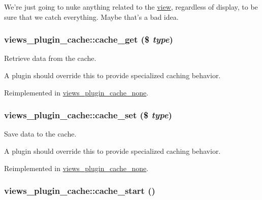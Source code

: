 We're just going to nuke anything related to the \hyperlink{classview}{view}, regardless of display, to be sure that we catch everything. Maybe that's a bad idea. \hypertarget{classviews__plugin__cache_77d1ef6d62d4eb84209cf310194b173b}{
\subsubsection[{cache\_\-get}]{\setlength{\rightskip}{0pt plus 5cm}views\_\-plugin\_\-cache::cache\_\-get (\$ {\em type})}}
\label{classviews__plugin__cache_77d1ef6d62d4eb84209cf310194b173b}


Retrieve data from the cache.

A plugin should override this to provide specialized caching behavior. 

Reimplemented in \hyperlink{classviews__plugin__cache__none_8c0a82cd971ea8abc1045107726a3f1d}{views\_\-plugin\_\-cache\_\-none}.\hypertarget{classviews__plugin__cache_4089f1652603b3e1012a8b0f00407c05}{
\subsubsection[{cache\_\-set}]{\setlength{\rightskip}{0pt plus 5cm}views\_\-plugin\_\-cache::cache\_\-set (\$ {\em type})}}
\label{classviews__plugin__cache_4089f1652603b3e1012a8b0f00407c05}


Save data to the cache.

A plugin should override this to provide specialized caching behavior. 

Reimplemented in \hyperlink{classviews__plugin__cache__none_0c66f7c812356a9327ec968c7de6dc47}{views\_\-plugin\_\-cache\_\-none}.\hypertarget{classviews__plugin__cache_a59c91a728401e1a49857346ae665ce7}{
\subsubsection[{cache\_\-start}]{\setlength{\rightskip}{0pt plus 5cm}views\_\-plugin\_\-cache::cache\_\-start ()}}
\label{classviews__plugin__cache_a59c91a728401e1a49857346ae665ce7}


